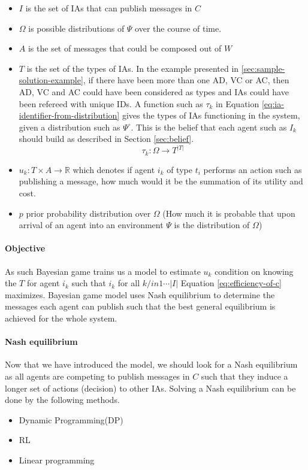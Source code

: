 \documentclass{article}
\begin{document}
\begin{multicols}{2}
		\begin{itemize}
			\item $I$ is the set of IAs that can publish messages in $C$
			\item $\Omega$ is possible distributions of $\Psi$ over the course of time.
			\item $A$ is the set of messages that could be composed out of $W$
			\item $T$ is the set of the types of IAs. In the example presented in \ref{sec:sample-solution-example}, if there have been more than one AD, VC or AC, then AD, VC and AC could have been considered as types and IAs could have been refereed with unique IDs. A function such as $\tau_k$ in Equation \ref{eq:ia-identifier-from-distribution} gives the types of IAs functioning in the system, given a distribution such as $\Psi^{\circ}$. This is the belief that each agent such as $I_k$ should build as described in Section \ref{sec:belief}.
			\begin{equation}
				\tau_{k}: \Omega \rightarrow T^{|T|}
				\label{eq:ia-identifier-from-distribution}
			\end{equation}
			\item $u_k\colon T\times A\rightarrow \mathbb {R}$ which denotes if agent $i_k$ of type $t_i$ performs an action such as publishing a message, how much would it be the summation of its utility and cost. 
			\item $p$ prior probability distribution over $\Omega$ (How much it is probable that upon arrival of an agent into an environment $\Psi$ is the distribution of $\Omega$)
		\end{itemize} 
		\paragraph{Objective }As such Bayesian game trains us a model to estimate $u_k$ condition on knowing the $T$ for agent $i_k$ such that $i_k$ 
		for all $k /in {1\dotsb|I|}$ Equation \ref{eq:efficiency-of-c} maximizes. Bayesian game model uses Nash equilibrium to determine the messages each agent can publish such that the best general equilibrium is achieved for the whole system. 
		\paragraph{Nash equilibrium} Now that we have introduced the model, we should look for a Nash equilibrium as all agents are competing to publish messages in $C$ such that they induce a longer set of actions (decision) to other IAs. Solving a Nash equilibrium can be done by the following methods.  
		\begin{itemize}
			\item Dynamic Programming(DP)
			\item RL
			\item Linear programming
		\end{itemize}	

\end{multicols}
\end{document}
